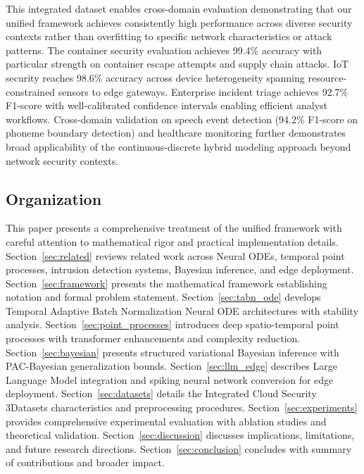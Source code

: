 \documentclass[10pt,journal,compsoc]{IEEEtran}
\begin{document}
This integrated dataset enables cross-domain evaluation demonstrating that our unified framework achieves consistently high performance across diverse security contexts rather than overfitting to specific network characteristics or attack patterns. The container security evaluation achieves 99.4\% accuracy with particular strength on container escape attempts and supply chain attacks. IoT security reaches 98.6\% accuracy across device heterogeneity spanning resource-constrained sensors to edge gateways. Enterprise incident triage achieves 92.7\% F1-score with well-calibrated confidence intervals enabling efficient analyst workflows. Cross-domain validation on speech event detection (94.2\% F1-score on phoneme boundary detection) and healthcare monitoring further demonstrates broad applicability of the continuous-discrete hybrid modeling approach beyond network security contexts.

\subsection{Organization}

This paper presents a comprehensive treatment of the unified framework with careful attention to mathematical rigor and practical implementation details. Section~\ref{sec:related} reviews related work across Neural ODEs, temporal point processes, intrusion detection systems, Bayesian inference, and edge deployment. Section~\ref{sec:framework} presents the mathematical framework establishing notation and formal problem statement. Section~\ref{sec:tabn_ode} develops Temporal Adaptive Batch Normalization Neural ODE architectures with stability analysis. Section~\ref{sec:point_processes} introduces deep spatio-temporal point processes with transformer enhancements and complexity reduction. Section~\ref{sec:bayesian} presents structured variational Bayesian inference with PAC-Bayesian generalization bounds. Section~\ref{sec:llm_edge} describes Large Language Model integration and spiking neural network conversion for edge deployment. Section~\ref{sec:datasets} details the Integrated Cloud Security 3Datasets characteristics and preprocessing procedures. Section~\ref{sec:experiments} provides comprehensive experimental evaluation with ablation studies and theoretical validation. Section~\ref{sec:discussion} discusses implications, limitations, and future research directions. Section~\ref{sec:conclusion} concludes with summary of contributions and broader impact.

\end{document}
